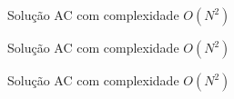 \begin{frame}[fragile]{Solução AC com complexidade $O(N^2)$}
\end{frame}

\begin{frame}[fragile]{Solução AC com complexidade $O(N^2)$}
\end{frame}

\begin{frame}[fragile]{Solução AC com complexidade $O(N^2)$}
\end{frame}
